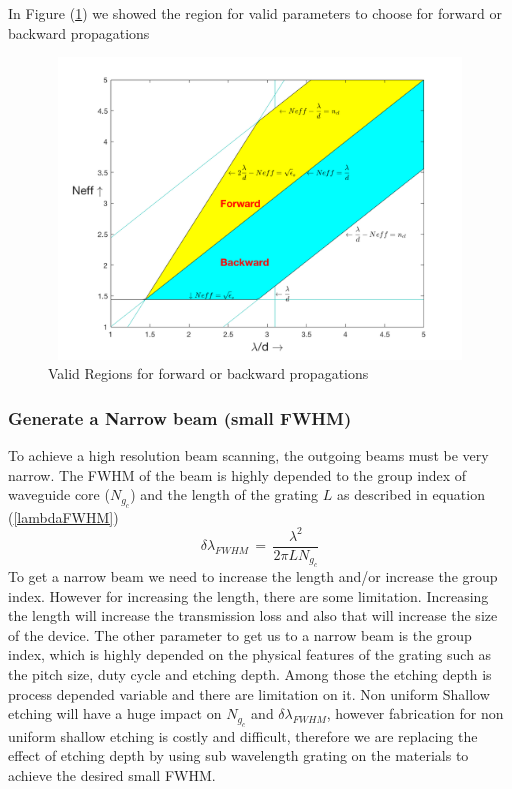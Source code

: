 \documentclass{article}
\begin{document}
In Figure (\ref{neff1}) we showed the region for valid parameters to choose for forward or backward propagations
\begin{figure}[H]
\begin{center}
\includegraphics[width=12cm, height=8cm]{Figures/neffConstraint}
\caption{Valid Regions for forward or backward propagations}
\label{neff1}
\end{center}
\end{figure}

\subsubsection{Generate a Narrow beam (small FWHM)}
\label{smallFWHM}
To achieve a high resolution beam scanning, the outgoing beams must be very narrow. The FWHM of the beam  is highly depended to the group index of waveguide core ($N_{g_c}$) and the length of the grating $L$ as described in equation (\ref{lambdaFWHM}) \cite{hongChoSungFWHMsize} 
\begin{equation}
\delta \lambda_{FWHM} \, = \, \frac{\lambda^2}{2 \pi L N_{g_c}}
\label{lambdaFWHM}
\end{equation}
To get a narrow beam we need to increase the length and/or increase the group index. However for increasing the length, there are some limitation. Increasing the length will increase the transmission loss and also that will increase the size of the device. 
The other parameter to get us to a narrow beam is the group index, which is highly depended on the physical features of the grating such as the pitch size, duty cycle and etching depth. Among those the etching depth is process depended variable and there are limitation on it. Non uniform Shallow etching will have a huge impact on $N_{g_c}$ and $\delta \lambda_{FWHM} $,  however fabrication for non uniform shallow etching is costly and difficult, therefore we are replacing the effect of etching depth by using sub wavelength grating on the materials to achieve the desired small FWHM. 
\end{document}
